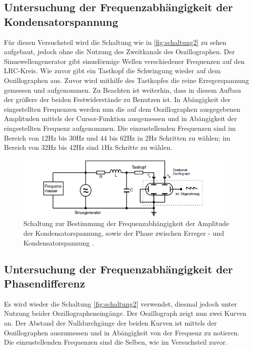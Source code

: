     \subsection{Untersuchung der Frequenzabhängigkeit der Kondensatorspannung}
        Für diesen Versuchsteil wird die Schaltung wie in \autoref{fig:schaltung2} zu sehen aufgebaut, jedoch ohne die Nutzung des Zweitkanals des Oszillographen.
        Der Sinuswellengenerator gibt sinusförmige Wellen verschiedener Frequenzen auf den LRC-Kreis. Wie zuvor gibt ein Tastkopf die Schwingung
        wieder auf dem Oszillographen aus. Zuvor wird mithilfe des Tastkopfes die reine Erregerspannung gemessen und aufgenommen. Zu Beachten 
        ist weiterhin, dass in diesem Aufbau der größere der beiden Festwiderstände zu Benutzen ist. In Abängigkeit der eingestellten Frequenzen
        werden nun die auf dem Oszillographen ausgegebenen Amplituden mittels der Cursor-Funktion ausgemessen und in Abängigkeit der eingestellten
        Frequenz aufgenommen. Die einzustellenden Frequenzen sind im Bereich von $12$Hz bis $30$Hz und $44$ bis $62$Hz in $2$Hz Schritten zu wählen;
        im Bereich von $32$Hz bis $42$Hz sind $1$Hz Schritte zu wählen.
        \begin{figure}
            \centering
            \includegraphics[width=\textwidth]{content/s2.png}
            \caption{Schaltung zur Bestimmung der Frequenzabhängigkeit der Amplitude der Kondensatorspannung, sowie der Phase zwischen Erreger - und Kondensatorspannung \cite[296]{V354}.}
            \label{fig:schaltung2}
        \end{figure} 
    \subsection{Untersuchung der Frequenzabhängigkeit der Phasendifferenz}
        Es wird wieder die Schaltung \autoref{fig:schaltung2} verwendet, diesmal jedoch unter Nutzung beider Oszillographeneingänge. Der Oszillograph
        zeigt nun zwei Kurven an. Der Abstand der Nulldurchgänge der beiden Kurven ist mittels der Oszillographen auszumessen und in 
        Abängigkeit von der Frequenz zu notieren. Die einzustellenden Frequenzen sind die Selben, wie im Versuchsteil zuvor.    